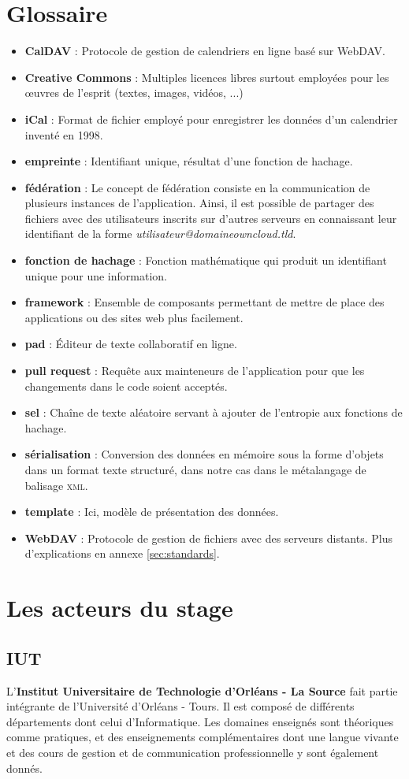 \documentclass[10pt,a4paper, twoside]{report}
\newcommand{\mychapter}[2]{
	\setcounter{chapter}{#1}
	\setcounter{section}{0}
	\chapter*{#2}
	\addcontentsline{toc}{chapter}{#2}
}
\begin{document}
	\mychapter{0}{Glossaire}
	\begin{itemize}
		\item \textbf{CalDAV} : Protocole de gestion de calendriers en ligne basé sur WebDAV.
		\item \textbf{Creative Commons} : Multiples licences libres surtout employées pour les œuvres de l'esprit (textes, images, vidéos, ...)
		\item \textbf{iCal} : Format de fichier employé pour enregistrer les données d'un calendrier inventé en 1998.
		\item \textbf{empreinte} : Identifiant unique, résultat d'une fonction de hachage.
		\item \textbf{fédération} : Le concept de fédération consiste en la communication de plusieurs instances de l'application. Ainsi, il est possible de partager des fichiers avec des utilisateurs inscrits sur d'autres serveurs en connaissant leur identifiant de la forme \textit{utilisateur@domaineowncloud.tld}.
		\item \textbf{fonction de hachage} : Fonction mathématique qui produit un identifiant unique pour une information.
		\item \textbf{framework} : Ensemble de composants permettant de mettre de place des applications ou des sites web plus facilement.
		\item \textbf{pad} : Éditeur de texte collaboratif en ligne.
		\item \textbf{pull request} : Requête aux mainteneurs de l'application pour que les changements dans le code soient acceptés.
		\item \textbf{sel} : Chaîne de texte aléatoire servant à ajouter de l'entropie aux fonctions de hachage.
		\item \textbf{sérialisation} : Conversion des données en mémoire sous la forme d'objets dans un format texte structuré, dans notre cas dans le métalangage de balisage \textsc{xml}.
		\item \textbf{template} : Ici, modèle de présentation des données.
		\item \textbf{WebDAV} : Protocole de gestion de fichiers avec des serveurs distants. Plus d'explications en annexe \ref{sec:standards}.
	\end{itemize}
	\thispagestyle{empty}
	\newpage\null\thispagestyle{empty}\newpage
	\chapter{Les acteurs du stage}
	\section{IUT}
	L'\textbf{Institut Universitaire de Technologie d'Orléans - La Source} fait partie intégrante de l'Université d'Orléans - Tours. Il est composé de différents départements dont celui d'Informatique. Les domaines enseignés sont théoriques comme pratiques, et des enseignements complémentaires dont une langue vivante et des cours de gestion et de communication professionnelle y sont également donnés.
	
\end{document}
